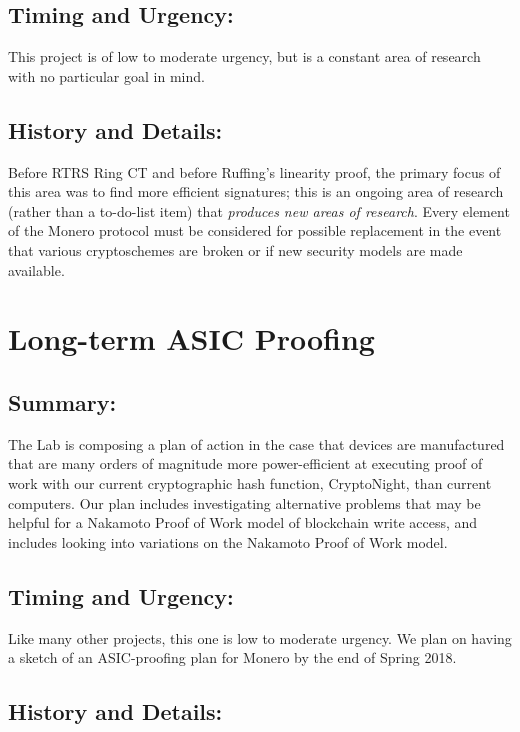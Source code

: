 \documentclass[12pt,english]{mrl}
\theoremstyle{definition}
\numberwithin{equation}{section}
\numberwithin{figure}{section}
\numberwithin{equation}{section}
\numberwithin{equation}{section}
\numberwithin{figure}{section}
\begin{document}
\subsection{Timing and Urgency:} 

This project is of low to moderate urgency, but is a constant area of research with no particular goal in mind. 

\subsection{History and Details:} 

Before RTRS Ring CT and before Ruffing's linearity proof, the primary focus of this area was to find more efficient signatures; this is an ongoing area of research (rather than a to-do-list item) that \textit{produces new areas of research}. Every element of the Monero protocol must be considered for possible replacement in the event that various cryptoschemes are broken or if new security models are made available. 
 
 
\section{Long-term ASIC Proofing}

\subsection{Summary:}

The Lab is composing a plan of action in the case that devices are manufactured that are many orders of magnitude more power-efficient at executing proof of work with our current cryptographic hash function, CryptoNight, than current computers. Our plan includes investigating alternative problems that may be helpful for a Nakamoto Proof of Work model of blockchain write access, and includes looking into variations on the Nakamoto Proof of Work model.

\subsection{Timing and Urgency:}

Like many other projects, this one is low to moderate urgency. We plan on having a sketch of an ASIC-proofing plan for Monero by the end of Spring 2018.

\subsection{History and Details:}
\end{document}
